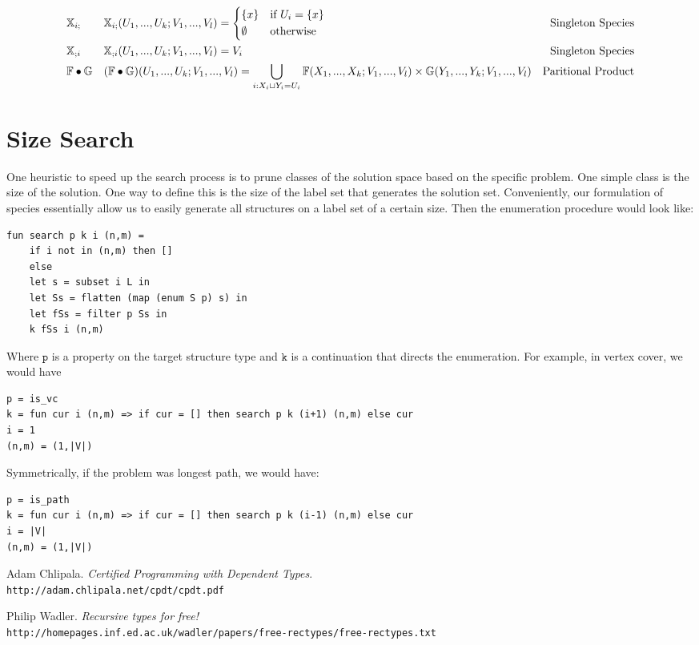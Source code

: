 \documentclass[11pt]{article}
\begin{document}
\begin{align*}
&\mathbb{X}_{i;} && \mathbb{X}_{i;}(U_1,...,U_k;V_1,...,V_l) = 
		\begin{cases*}
      \{x\} & if $U_i = \{x\}$\\
      \emptyset        & otherwise
    \end{cases*} & \text{Singleton Species}\\
&\mathbb{X}_{;i} && \mathbb{X}_{;i}(U_1,...,U_k;V_1,...,V_l) =  V_i & \text{Singleton Species}\\
&\mathbb{F} \bullet \mathbb{G} && (\mathbb{F} \bullet \mathbb{G})(U_1,...,U_k;V_1,...,V_l) = 
	\bigcup_{i : X_i \sqcup Y_i = U_i}	
		\mathbb{F}(X_1,...,X_k;V_1,...,V_l) \times \mathbb{G}(Y_1,...,Y_k;V_1,...,V_l) &
\text{Paritional Product}\\
\end{align*}

\section{Size Search}

One heuristic to speed up the search process is to prune classes of the solution space based on the specific
problem. One simple class is the size of the solution. One way to define this is the size of the label 
set that generates the solution set. Conveniently, our formulation of 
species essentially allow us to easily generate all structures on 
a label set of a certain size. Then the enumeration procedure would look like:

\begin{verbatim}
fun search p k i (n,m) = 
	if i not in (n,m) then []
	else
    let s = subset i L in
    let Ss = flatten (map (enum S p) s) in 
    let fSs = filter p Ss in 
    k fSs i (n,m)  
\end{verbatim}

Where $\texttt{p}$ is a property on the target structure type and
$\texttt{k}$ is a continuation that directs the enumeration. For example, in vertex cover, we would have 
\begin{verbatim}
p = is_vc
k = fun cur i (n,m) => if cur = [] then search p k (i+1) (n,m) else cur
i = 1
(n,m) = (1,|V|)
\end{verbatim}

Symmetrically, if the problem was longest path, we would have:
\begin{verbatim}
p = is_path
k = fun cur i (n,m) => if cur = [] then search p k (i-1) (n,m) else cur 
i = |V|
(n,m) = (1,|V|)
\end{verbatim}


\begin{thebibliography}{9}
 Adam Chlipala.
\textit{Certified Programming with Dependent Types}.
\\\texttt{http://adam.chlipala.net/cpdt/cpdt.pdf}
 
Philip Wadler.
\textit{Recursive types for free!}
\\\texttt{http://homepages.inf.ed.ac.uk/wadler/papers/free-rectypes/free-rectypes.txt}
\end{thebibliography}
 
\end{document}
